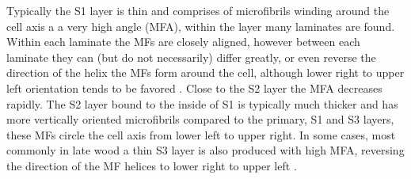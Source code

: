 Typically the S1 layer is thin and comprises of microfibrils winding around the
cell axis a a very high angle (MFA), within the layer many laminates are found.
Within each laminate the MFs are closely aligned, however between each laminate
they can (but do not necessarily) differ greatly, or even reverse the direction
of the helix the MFs form around the cell, although lower right to upper left
orientation tends to be favored \cite{fromm2013cellular}. Close to the S2 layer the MFA decreases
rapidly. The S2 layer bound to the inside of S1 is typically much thicker and
has more vertically oriented microfibrils compared to the primary, S1 and S3
layers, these MFs circle the cell axis from lower left to upper right. In
some cases, most commonly in late wood a thin S3 layer is also produced with
high MFA, reversing the direction of the MF helices to lower right to upper
left \cite{walker1993primary}.
